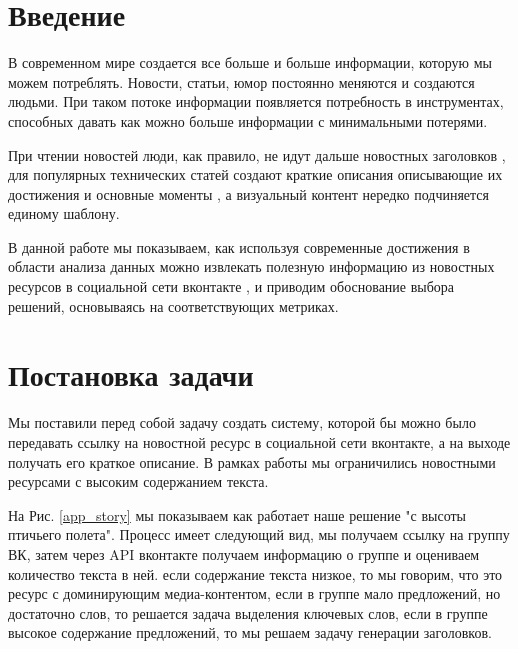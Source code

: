 \documentclass[14pt]{matmex-diploma-custom}
\begin{document}

\section*{Введение}
В современном мире создается все больше и больше информации, которую мы можем потреблять.
Новости, статьи, юмор постоянно меняются и создаются людьми. При таком потоке информации
появляется потребность в инструментах, способных давать как можно больше информации
с минимальными потерями.

При чтении новостей люди, как правило, не идут дальше новостных заголовков \cite{jaysondemers2016},
для популярных технических статей создают краткие описания описывающие их достижения
и основные моменты \cite{tldr_arxiv2019, articleessence2019}, а визуальный контент нередко подчиняется единому шаблону.

В данной работе мы показываем, как используя современные достижения в области анализа
данных можно извлекать полезную информацию из новостных ресурсов в социальной сети вконтакте \cite{vk2019},
и приводим обоснование выбора решений, основываясь на соответствующих метриках.

\section{Постановка задачи}
Мы поставили перед собой задачу создать систему, которой бы можно было передавать ссылку на новостной ресурс в социальной сети вконтакте, а на выходе получать его краткое описание. В рамках работы мы ограничились новостными ресурсами с высоким содержанием текста.

На Рис. \ref{app_story} мы показываем как работает наше решение "с высоты птичьего полета". Процесс имеет следующий вид, мы получаем ссылку на группу ВК, затем через API вконтакте получаем информацию о группе и оцениваем количество текста в ней. если содержание текста низкое, то мы говорим, что это ресурс с доминирующим медиа-контентом, если в группе мало предложений, но достаточно слов, то решается задача выделения ключевых слов, если в группе высокое содержание предложений, то мы решаем задачу генерации заголовков.
\end{document}
